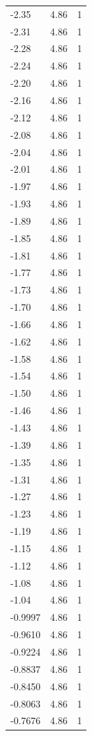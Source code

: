 \begin{longtable}{lrr}
  -2.35 & 4.86 & 1 \\
  -2.31 & 4.86 & 1 \\
  -2.28 & 4.86 & 1 \\
  -2.24 & 4.86 & 1 \\
  -2.20 & 4.86 & 1 \\
  -2.16 & 4.86 & 1 \\
  -2.12 & 4.86 & 1 \\
  -2.08 & 4.86 & 1 \\
  -2.04 & 4.86 & 1 \\
  -2.01 & 4.86 & 1 \\
  -1.97 & 4.86 & 1 \\
  -1.93 & 4.86 & 1 \\
  -1.89 & 4.86 & 1 \\
  -1.85 & 4.86 & 1 \\
  -1.81 & 4.86 & 1 \\
  -1.77 & 4.86 & 1 \\
  -1.73 & 4.86 & 1 \\
  -1.70 & 4.86 & 1 \\
  -1.66 & 4.86 & 1 \\
  -1.62 & 4.86 & 1 \\
  -1.58 & 4.86 & 1 \\
  -1.54 & 4.86 & 1 \\
  -1.50 & 4.86 & 1 \\
  -1.46 & 4.86 & 1 \\
  -1.43 & 4.86 & 1 \\
  -1.39 & 4.86 & 1 \\
  -1.35 & 4.86 & 1 \\
  -1.31 & 4.86 & 1 \\
  -1.27 & 4.86 & 1 \\
  -1.23 & 4.86 & 1 \\
  -1.19 & 4.86 & 1 \\
  -1.15 & 4.86 & 1 \\
  -1.12 & 4.86 & 1 \\
  -1.08 & 4.86 & 1 \\
  -1.04 & 4.86 & 1 \\
  -0.9997 & 4.86 & 1 \\
  -0.9610 & 4.86 & 1 \\
  -0.9224 & 4.86 & 1 \\
  -0.8837 & 4.86 & 1 \\
  -0.8450 & 4.86 & 1 \\
  -0.8063 & 4.86 & 1 \\
  -0.7676 & 4.86 & 1 \\

\end{longtable}
